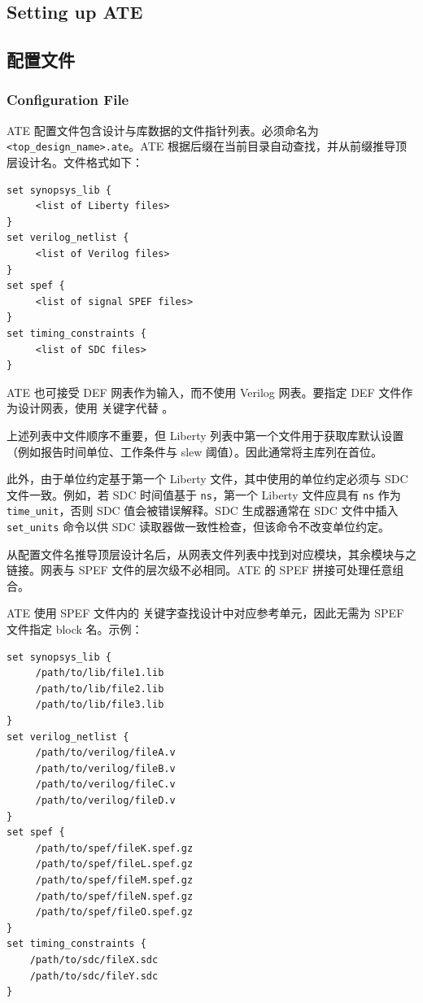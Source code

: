 \subsection*{Setting up ATE}

\subsection{配置文件}
\subsubsection*{Configuration File}

ATE 配置文件包含设计与库数据的文件指针列表。必须命名为 \texttt{<top\_design\_name>.ate}。ATE 根据后缀在当前目录自动查找，并从前缀推导顶层设计名。文件格式如下：
\begin{lstlisting}
set synopsys_lib {
     <list of Liberty files>
}
set verilog_netlist {
     <list of Verilog files>
}
set spef {
     <list of signal SPEF files>
}
set timing_constraints {
     <list of SDC files>
}
\end{lstlisting}

ATE 也可接受 DEF 网表作为输入，而不使用 Verilog 网表。要指定 DEF 文件作为设计网表，使用  关键字代替 。

上述列表中文件顺序不重要，但 Liberty 列表中第一个文件用于获取库默认设置（例如报告时间单位、工作条件与 slew 阈值）。因此通常将主库列在首位。

此外，由于单位约定基于第一个 Liberty 文件，其中使用的单位约定必须与 SDC 文件一致。例如，若 SDC 时间值基于 \texttt{ns}，第一个 Liberty 文件应具有 \texttt{ns} 作为 \texttt{time\_unit}，否则 SDC 值会被错误解释。SDC 生成器通常在 SDC 文件中插入 \texttt{set\_units} 命令以供 SDC 读取器做一致性检查，但该命令不改变单位约定。

从配置文件名推导顶层设计名后，从网表文件列表中找到对应模块，其余模块与之链接。网表与 SPEF 文件的层次级不必相同。ATE 的 SPEF 拼接可处理任意组合。

ATE 使用 SPEF 文件内的  关键字查找设计中对应参考单元，因此无需为 SPEF 文件指定 block 名。示例：
\begin{lstlisting}
set synopsys_lib {
     /path/to/lib/file1.lib
     /path/to/lib/file2.lib
     /path/to/lib/file3.lib
}
set verilog_netlist {
     /path/to/verilog/fileA.v
     /path/to/verilog/fileB.v
     /path/to/verilog/fileC.v
     /path/to/verilog/fileD.v
}
set spef {
     /path/to/spef/fileK.spef.gz
     /path/to/spef/fileL.spef.gz
     /path/to/spef/fileM.spef.gz
     /path/to/spef/fileN.spef.gz
     /path/to/spef/fileO.spef.gz
}
set timing_constraints {
    /path/to/sdc/fileX.sdc
    /path/to/sdc/fileY.sdc
}
\end{lstlisting}

